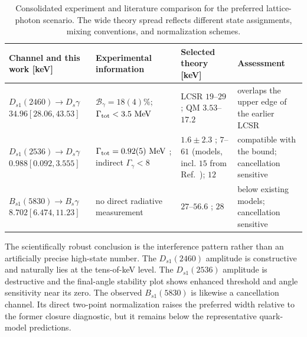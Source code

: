 \documentclass[11pt]{article}
\newcommand{\Ds}{D_s}
\newcommand{\Dsone}{D_{s1}}
\newcommand{\Bs}{B_s}
\newcommand{\Bsone}{B_{s1}}
\newcommand{\MeV}{\mathrm{MeV}}
\begin{document}
\begin{table}[htbp]
  \centering
  \footnotesize
  \setlength{\tabcolsep}{3pt}
  \begin{tabular}{L{0.24\textwidth}L{0.24\textwidth}
                  L{0.29\textwidth}L{0.16\textwidth}}
    \toprule
    Channel and this work [keV] & Experimental information
      & Selected theory [keV] & Assessment\\
    \midrule
    $\Dsone(2460)\to\Ds\gamma$\newline
      $34.96[28.06,43.53]$
      & $\mathcal B_\gamma=18(4)\%$;\newline
        $\Gamma_{\rm tot}<3.5~\MeV$
        \cite{PDG2025Update}
      & LCSR $19$--$29$ \cite{Colangelo2005};
        QM $3.53$--$17.2$ \cite{GoityRoberts2001,Chen2020Electric}
      & overlaps the upper edge of the earlier LCSR\\
    $\Dsone(2536)\to\Ds\gamma$\newline
      $0.988[0.092,3.555]$
      & $\Gamma_{\rm tot}=0.92(5)~\MeV$ \cite{PDG2025Update};\newline
        indirect $\Gamma_\gamma<8$ \cite{Bondar2025Why}
      & $1.6\pm2.3$ \cite{KornerPirjolSchilcher1993};
        $7$--$61$ (models, incl. $15$ from Ref.~\cite{Godfrey2003Radiative});
        $12$ \cite{BondarMilstein2025}
      & compatible with the bound; cancellation sensitive\\
    $\Bsone(5830)\to\Bs\gamma$\newline
      $8.702[6.474,11.23]$
      & no direct radiative measurement \cite{CMS2018}
      & $27$--$56.6$ \cite{LiNiZhong2021,GodfreyMoatsSwanson2016,LuPanWang2016};
        $28$ \cite{BondarMilstein2025}
      & below existing models; cancellation sensitive\\
    \bottomrule
  \end{tabular}
  \caption{Consolidated experiment and literature comparison for the preferred
  lattice-photon scenario.  The wide theory spread reflects different
  state assignments, mixing conventions, and normalization schemes.}
  \label{tab:conclusion-comparison}
\end{table}

The scientifically robust conclusion is the interference pattern rather than
an artificially precise high-state number.  The $\Dsone(2460)$ amplitude is
constructive and naturally lies at the tens-of-keV level.  The
$\Dsone(2536)$ amplitude is destructive and the final-angle stability plot
shows enhanced threshold and angle sensitivity near its zero.  The observed
$\Bsone(5830)$ is likewise a cancellation channel.  Its direct two-point
normalization raises the preferred width relative to the former closure
diagnostic, but it remains below the representative quark-model predictions.
\end{document}
